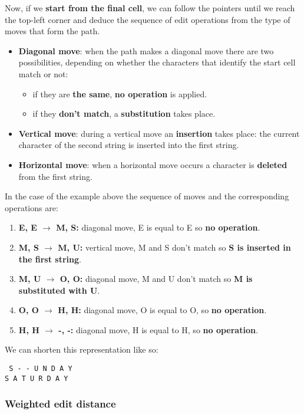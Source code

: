 \documentclass[12pt, letterpaper]{article}
\begin{document}
Now, if we \textbf{start from the final cell}, we can follow the pointers until we reach the top-left corner and deduce the sequence of edit operations from the type of moves that form the path.
\begin{itemize}
\item \textbf{Diagonal move}: when the path makes a diagonal move there are two possibilities, depending on whether the characters that identify the start cell match or not:
	\begin{itemize}
	\item if they are \textbf{the same}, \textbf{no operation} is applied.
	\item if they \textbf{don't match}, a \textbf{substitution} takes place.
	\end{itemize}
\item \textbf{Vertical move}: during a vertical move an \textbf{insertion} takes place: the current character of the second string is inserted into the first string.
\item \textbf{Horizontal move}: when a horizontal move occurs a character is \textbf{deleted} from the first string.
\end{itemize}

In the case of the example above the sequence of moves and the corresponding operations are:
\begin{enumerate}
\item \textbf{E, E $\rightarrow$ M, S:} diagonal move, E is equal to E so \textbf{no operation}.
\item \textbf{M, S $\rightarrow$ M, U:} vertical move, M and S don't match so \textbf{S is inserted in the first string}.
\item \textbf{M, U $\rightarrow$ O, O:} diagonal move, M and U don't match so \textbf{M is substituted with U}.
\item \textbf{O, O $\rightarrow$ H, H:} diagonal move, O is equal to O, so \textbf{no operation}.
\item \textbf{H, H $\rightarrow$ -, -:} diagonal move, H is equal to H, so \textbf{no operation}.
\end{enumerate}

We can shorten this representation like so:
\begin{center}
\tt 
S - - U N D A Y \\
S A T U R D A Y
\end{center}

\subsubsection{Weighted edit distance}
\end{document}
